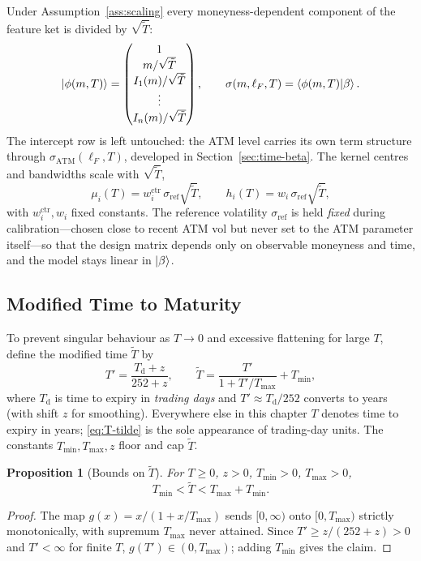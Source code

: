 \documentclass[11pt]{book}
\theoremstyle{plain}
\newtheorem{proposition}[theorem]{Proposition}
\theoremstyle{definition}
\theoremstyle{remark}
\newcommand{\ket}[1]{\mathinner{\lvert #1 \rangle}}
\newcommand{\braket}[1]{\mathinner{\langle #1 \rangle}}
\newcommand{\parket}{\ket{\beta}}                %
\newcommand{\mln}{m}                             %
\newcommand{\lF}{\ell_F}                         %
\newcommand{\satm}{\sigma_{\mathrm{ATM}}}        %
\newcommand{\sref}{\sigma_{\mathrm{ref}}}        %
\begin{document}
Under Assumption~\ref{ass:scaling} every moneyness-dependent
component of the feature ket is divided by $\sqrt{\tilde T}$:
\begin{equation}\label{eq:phi-time}
\ket{\phi(\mln,T)} = \begin{pmatrix} 1 \\ \mln/\sqrt{\tilde T} \\
I_1(\mln)/\sqrt{\tilde T} \\ \vdots \\ I_n(\mln)/\sqrt{\tilde T}
\end{pmatrix},
\qquad
\sigma(\mln,\lF,T) = \braket{\phi(\mln,T)|\beta}.
\end{equation}
The intercept row is left untouched: the ATM level carries its own term
structure through $\satm(\lF,T)$, developed in Section~\ref{sec:time-beta}. The
kernel centres and bandwidths scale with $\sqrt{\tilde T}$,
\begin{equation}\label{eq:kernel-scaling}
\mu_i(T) = w_i^{\mathrm{ctr}}\,\sref\sqrt{\tilde T},
\qquad
h_i(T)   = w_i\,\sref\sqrt{\tilde T},
\end{equation}
with $w_i^{\mathrm{ctr}}, w_i$ fixed constants. The reference volatility $\sref$
is held \emph{fixed} during calibration---chosen close to recent ATM vol but
never set to the ATM parameter itself---so that the design matrix depends only
on observable moneyness and time, and the model stays linear in $\parket$.

\subsection{Modified Time to Maturity}
\label{sec:modified-time}

To prevent singular behaviour as $T\to 0$ and excessive flattening for large
$T$, define the modified time $\tilde T$ by
\begin{equation}\label{eq:T-tilde}
T' = \frac{T_{\mathrm{d}} + z}{252 + z},
\qquad
\tilde T = \frac{T'}{1 + T'/T_{\max}} + T_{\min},
\end{equation}
where $T_{\mathrm{d}}$ is time to expiry in \emph{trading days} and
$T' \approx T_{\mathrm{d}}/252$ converts to years (with shift $z$ for
smoothing). Everywhere else in this chapter $T$ denotes time to expiry in
years; \eqref{eq:T-tilde} is the sole appearance of trading-day units. The
constants $T_{\min}, T_{\max}, z$ floor and cap $\tilde T$.

\begin{proposition}[Bounds on $\tilde T$]\label{prop:T-bounds}
For $T\ge 0$, $z>0$, $T_{\min}>0$, $T_{\max}>0$,
\[
T_{\min} < \tilde T < T_{\max} + T_{\min}.
\]
\end{proposition}
\begin{proof}
The map $g(x) = x/(1+x/T_{\max})$ sends $[0,\infty)$ onto $[0,T_{\max})$
strictly monotonically, with supremum $T_{\max}$ never attained. Since
$T' \ge z/(252+z) > 0$ and $T' < \infty$ for finite $T$,
$g(T') \in (0,T_{\max})$; adding $T_{\min}$ gives the claim.
\end{proof}
\end{document}
